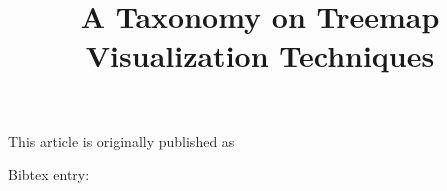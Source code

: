 \documentclass[]{cgspreprint}
\title{A Taxonomy on Treemap Visualization Techniques}
\begin{document}


\maketitle

\noindent This article is originally published as

\medskip
\noindent Bibtex entry:

\end{document}
